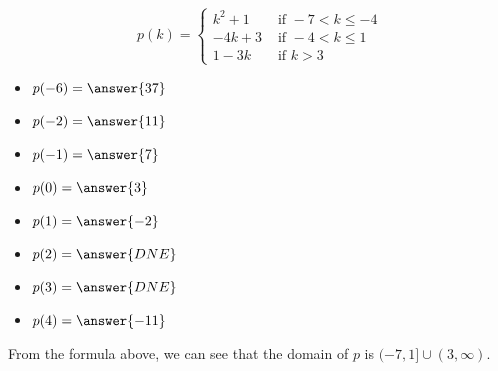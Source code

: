 \documentclass{ximera}
\begin{document}
\begin{question}

\[
p(k) = 
\begin{cases}
  k^2 + 1 & \text{ if } -7 < k \leq -4 \\
  -4k + 3 & \text{ if } -4 < k \leq 1 \\
  1 - 3k & \text{ if } k > 3
\end{cases}
\]


\begin{itemize}
\item $p(-6) = \answer{37}$  
\item $p(-2) = \answer{11}$ 
\item $p(-1) = \answer{7}$ 
\item $p(0) = \answer{3}$ 
\item $p(1) = \answer{-2}$ 
\item $p(2) = \answer{DNE}$ 
\item $p(3) = \answer{DNE}$ 
\item $p(4) = \answer{-11}$ 
\end{itemize}

\end{question}



From the formula above, we can see that the domain of $p$ is $(-7, 1] \cup (3, \infty)$.
\end{document}
